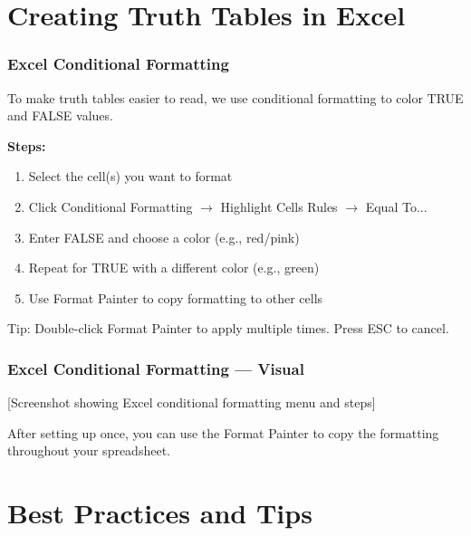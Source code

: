 \documentclass{beamer}
\begin{document}
\section{Creating Truth Tables in Excel}

\begin{frame}
\frametitle{Excel Conditional Formatting}
To make truth tables easier to read, we use \alert{conditional formatting} to color TRUE and FALSE values.\pause

\vspace{0.3cm}
\textbf{Steps:}
\begin{enumerate}
    \item Select the cell(s) you want to format\pause
    \item Click Conditional Formatting $\rightarrow$ Highlight Cells Rules $\rightarrow$ Equal To...\pause
    \item Enter FALSE and choose a color (e.g., red/pink)\pause
    \item Repeat for TRUE with a different color (e.g., green)\pause
    \item Use Format Painter to copy formatting to other cells
\end{enumerate}\pause

\vspace{0.3cm}
\alert{Tip:} Double-click Format Painter to apply multiple times. Press ESC to cancel.
\end{frame}

\begin{frame}
\frametitle{Excel Conditional Formatting --- Visual}
\alert{[Screenshot showing Excel conditional formatting menu and steps]}

\vspace{0.5cm}
After setting up once, you can use the Format Painter to copy the formatting throughout your spreadsheet.
\end{frame}

\section{Best Practices and Tips}
\end{document}

